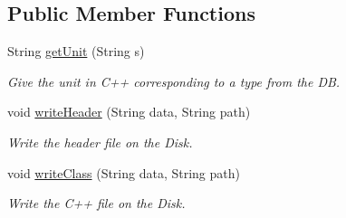\subsection*{Public Member Functions}
\begin{DoxyCompactItemize}
\item 
String \hyperlink{class_classes_c_p_p_1_1_class_generator_a555b780302fd8d99eae0e7683acf05ca}{getUnit} (String s)
\begin{DoxyCompactList}\small\item\em Give the unit in C++ corresponding to a type from the DB. \end{DoxyCompactList}\item 
void \hyperlink{class_classes_c_p_p_1_1_class_generator_ae123072c95ebe28228b6084c747786a5}{writeHeader} (String data, String path)
\begin{DoxyCompactList}\small\item\em Write the header file on the Disk. \end{DoxyCompactList}\item 
void \hyperlink{class_classes_c_p_p_1_1_class_generator_ac1526541be988afd7a209d600b15449a}{writeClass} (String data, String path)
\begin{DoxyCompactList}\small\item\em Write the C++ file on the Disk. \end{DoxyCompactList}\end{DoxyCompactItemize}

